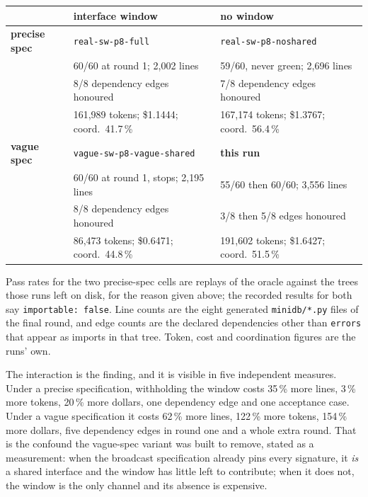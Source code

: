 \documentclass[11pt]{article}
\begin{document}
\begin{center}\small
\begin{tabular}{@{}lll@{}}
\toprule
 & \textbf{interface window} & \textbf{no window} \\
\midrule
\textbf{precise spec}
  & \texttt{real-sw-p8-full}
  & \texttt{real-sw-p8-noshared} \\
  & 60/60 at round 1; 2,002 lines
  & 59/60, never green; 2,696 lines \\
  & 8/8 dependency edges honoured
  & 7/8 dependency edges honoured \\
  & 161,989 tokens; \$1.1444; coord.\ 41.7\,\%
  & 167,174 tokens; \$1.3767; coord.\ 56.4\,\% \\
\addlinespace
\textbf{vague spec}
  & \texttt{vague-sw-p8-vague-shared}
  & \textbf{this run} \\
  & 60/60 at round 1, stops; 2,195 lines
  & 55/60 then 60/60; 3,556 lines \\
  & 8/8 dependency edges honoured
  & 3/8 then 5/8 edges honoured \\
  & 86,473 tokens; \$0.6471; coord.\ 44.8\,\%
  & 191,602 tokens; \$1.6427; coord.\ 51.5\,\% \\
\bottomrule
\end{tabular}\normalsize
\end{center}
\smallskip
\noindent\footnotesize Pass rates for the two precise-spec cells are replays of the oracle
against the trees those runs left on disk, for the reason given above; the recorded results for
both say \texttt{importable: false}. Line counts are the eight generated \texttt{minidb/*.py}
files of the final round, and edge counts are the declared dependencies other than
\texttt{errors} that appear as imports in that tree. Token, cost and coordination figures are
the runs' own.\normalsize

The interaction is the finding, and it is visible in five independent measures. Under a precise
specification, withholding the window costs 35\,\% more lines, 3\,\% more tokens, 20\,\% more
dollars, one dependency edge and one acceptance case. Under a vague specification it costs
62\,\% more lines, 122\,\% more tokens, 154\,\% more dollars, five dependency edges in round one
and a whole extra round. That is the confound the vague-spec variant was built to remove, stated
as a measurement: when the broadcast specification already pins every signature, it \emph{is} a
shared interface and the window has little left to contribute; when it does not, the window is
the only channel and its absence is expensive.
\end{document}
